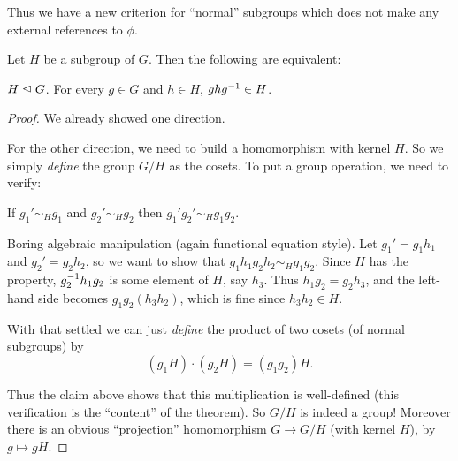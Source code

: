 Thus we have a new criterion for ``normal'' subgroups which does not
make any external references to $\phi$.
\begin{theorem}
	Let $H$ be a subgroup of $G$.
	Then the following are equivalent:
	\begin{itemize}
		\ii $H \trianglelefteq G$.
		\ii For every $g \in G$ and $h \in H$, $ghg^{-1} \in H$.
	\end{itemize}
\end{theorem}
\begin{proof}
	We already showed one direction.

	For the other direction, we need to build a homomorphism with kernel $H$.
	So we simply \emph{define} the group $G/H$ as the cosets.
	To put a group operation, we need to verify:
	\begin{claim}
		If $g_1' \sim_H g_1$ and $g_2' \sim_H g_2$ then $g_1'g_2' \sim_H g_1g_2$.
	\end{claim}
	\begin{subproof}
		Boring algebraic manipulation (again functional equation style).
		Let $g_1' = g_1h_1$ and $g_2' = g_2h_2$, so we want to show that
		$g_1h_1g_2h_2 \sim_H g_1g_2$.
		Since $H$ has the property, $g_2^{-1} h_1g_2$ is some element of $H$, say $h_3$.
		Thus $h_1 g_2 = g_2 h_3$, and the left-hand side becomes $g_1g_2(h_3h_2)$,
		which is fine since $h_3h_2 \in H$.
	\end{subproof}
	With that settled we can just \emph{define} the
	product of two cosets (of normal subgroups) by \[ (g_1H) \cdot (g_2H) = (g_1g_2)H. \]

	Thus the claim above shows that this multiplication is well-defined
	(this verification is the ``content'' of the theorem).
	So $G/H$ is indeed a group!
	Moreover there is an obvious ``projection'' homomorphism
	$G \to G/H$ (with kernel $H$), by $g \mapsto gH$.
\end{proof}

